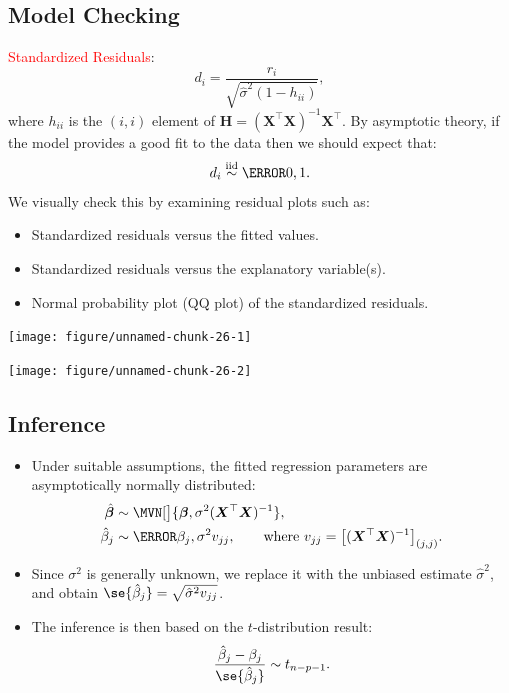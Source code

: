 \documentclass[oneside]{book}\usepackage[]{graphicx}\usepackage[svgnames]{xcolor}
\newenvironment{knitrout}{}{} %
\newcommand*\circled[1]{\tikz[baseline=(char.base)]{\node[shape=circle,draw,inner sep=2pt] (char) {#1};}}
\newcommand{\iid}{\overset{\text{iid}}{\sim}}%
\providecommand{\Vector}[1]{\bm{#1}}%
\providecommand{\Matrix}[1]{\bm{#1}}
\begin{document}
\subsection*{\circled{3} Model Checking}
\textcolor{Red}{Standardized Residuals}:
\[ d_i=\frac{r_i}{\sqrt{\hat{\sigma}^2(1-h_{ii})}},  \]
where $ h_{ii} $ is the $ (i,i) $ element of $ \Matrix{H}=(\Matrix{X}^\top\Matrix{X})^{-1}\Matrix{X}^\top $.
By asymptotic theory, if the model provides a good fit to the data then we
should expect that:
\[ d_i\iid \N{0,1}. \]
We visually check this by examining residual plots such as:
\begin{itemize}
      \item Standardized residuals versus the fitted values.
      \item Standardized residuals versus the explanatory variable(s).
      \item Normal probability plot (QQ plot) of the standardized residuals.
\end{itemize}
\begin{knitrout}
\color{fgcolor}

{\centering \texttt{[image: figure/unnamed-chunk-26-1]} 

}




{\centering \texttt{[image: figure/unnamed-chunk-26-2]} 

}


\end{knitrout}

\subsection*{\circled{4} Inference}
\begin{itemize}
      \item Under suitable assumptions, the fitted regression parameters are asymptotically
            normally distributed:
            \begin{align*}
                  \hat{\Vector{\beta}} & \sim \MVN[\big]{\Vector{\beta},\sigma^2(\Matrix{X}^\top \Matrix{X})^{-1}},                                        \\
                  \hat{\beta}_j        & \sim \N{\beta_j,\sigma^2v_{jj}},\qquad\text{where $v_{jj}=\bigl[(\Matrix{X}^\top\Matrix{X})^{-1}\bigr]_{(j,j)}$}.
            \end{align*}
      \item Since $ \sigma^2 $ is generally unknown, we replace it with the unbiased estimate $ \hat{\sigma}^2 $, and obtain $ \se{\hat{\beta}_j}=\sqrt{\hat{\sigma}^2v_{jj}} $.
      \item The inference is then based on the $t$-distribution result:
            \[ \frac{\hat{\beta}_j-\beta_j}{\se{\hat{\beta}_j}}\sim t_{n-p-1}.  \]
\end{itemize}
\end{document}
